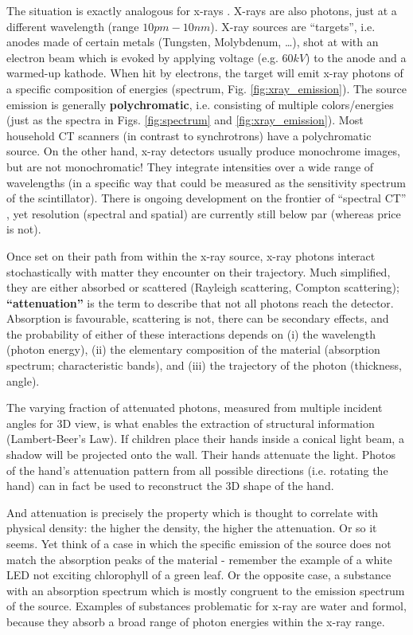 The situation is exactly analogous for x-rays \citep{Berger2018,Buzug2008}.
X-rays are also photons, just at a different wavelength (range \(10pm - 10nm\)).
X-ray sources are ``targets'', i.e. anodes made of certain metals (Tungsten, Molybdenum, \ldots{}), shot at with an electron beam which is evoked by applying voltage (e.g. \(60 kV\)) to the anode and a warmed-up kathode.
When hit by electrons, the target will emit x-ray photons of a specific composition of energies (spectrum, Fig. \ref{fig:xray_emission}).
The source emission is generally \textbf{polychromatic}, i.e. consisting of multiple colors/energies (just as the spectra in Figs. \ref{fig:spectrum} and \ref{fig:xray_emission}).
Most household CT scanners (in contrast to synchrotrons) have a polychromatic source.
On the other hand, x-ray detectors usually produce monochrome images, but are not monochromatic!
They integrate intensities over a wide range of wavelengths (in a specific way that could be measured as the sensitivity spectrum of the scintillator).
There is ongoing development on the frontier of ``spectral CT'' \citep{Liu2023}, yet resolution (spectral and spatial) are currently still below par (whereas price is not).


Once set on their path from within the x-ray source, x-ray photons interact stochastically with matter they encounter on their trajectory.
Much simplified, they are either absorbed or scattered (Rayleigh scattering, Compton scattering); \textbf{``attenuation''} is the term to describe that not all photons reach the detector.
Absorption is favourable, scattering is not, there can be secondary effects, and the probability of either of these interactions depends on (i) the wavelength (photon energy), (ii) the elementary composition of the material (absorption spectrum; characteristic bands), and (iii) the trajectory of the photon (thickness, angle).


The varying fraction of attenuated photons, measured from multiple incident angles for 3D view, is what enables the extraction of structural information (Lambert-Beer's Law).
If children place their hands inside a conical light beam, a shadow will be projected onto the wall.
Their hands attenuate the light.
Photos of the hand's attenuation pattern from all possible directions (i.e. rotating the hand) can in fact be used to reconstruct the 3D shape of the hand.

And attenuation is precisely the property which is thought to correlate with physical density: the higher the density, the higher the attenuation.
Or so it seems.
Yet think of a case in which the specific emission of the source does not match the absorption peaks of the material - remember the example of a white LED not exciting chlorophyll of a green leaf.
Or the opposite case, a substance with an absorption spectrum which is mostly congruent to the emission spectrum of the source.
Examples of substances problematic for x-ray are water and formol, because they absorb a broad range of photon energies within the x-ray range.


